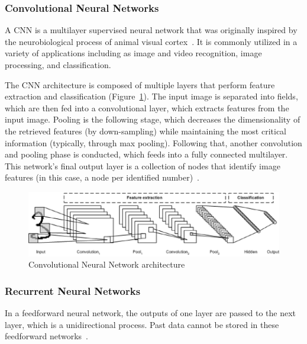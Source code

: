 \subsubsection{Convolutional Neural Networks}

A \gls{CNN} is a multilayer supervised neural network that was originally inspired by the neurobiological process of animal visual cortex~\cite{Ganatra2018ATools}. It is commonly utilized in a variety of applications including as image and video recognition, image processing, and classification.

The \gls{CNN} architecture is composed of multiple layers that perform feature extraction and classification (Figure~\ref{fig:cnn}). The input image is separated into fields, which are then fed into a convolutional layer, which extracts features from the input image. Pooling is the following stage, which decreases the dimensionality of the retrieved features (by down-sampling) while maintaining the most critical information (typically, through max pooling). Following that, another convolution and pooling phase is conducted, which feeds into a fully connected multilayer. This network's final output layer is a collection of nodes that identify image features (in this case, a node per identified number)~\cite{Madhavan2021DeepDeveloper}.

\begin{figure}[htbp]
    \centering
    \includegraphics[width=\linewidth]{Chapters/Figures/cnn.png}
    \caption{Convolutional Neural Network architecture~\cite{Madhavan2021DeepDeveloper}}
    \label{fig:cnn}
\end{figure}

\subsubsection{Recurrent Neural Networks}

In a feedforward neural network, the outputs of one layer are passed to the next layer, which is a unidirectional process. Past data cannot be stored in these feedforward networks~\cite{Shewalkar2019PerformanceGRU}. 

